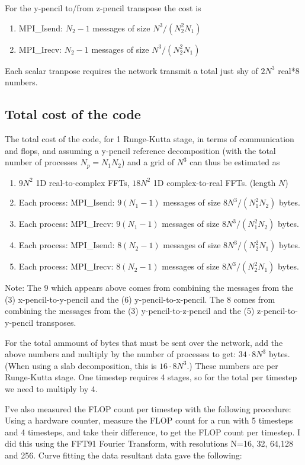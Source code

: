 \documentclass[12pt]{article}
\begin{document}
For the y-pencil to/from z-pencil transpose the cost is
\begin{enumerate}
\item MPI\_Isend:  $N_2 -1$ messages of size $N^3/(N_2^2 N_1)$
\item MPI\_Irecv:  $N_2 -1$ messages of size $N^3/(N_2^2 N_1)$
\end{enumerate}


Each scalar tranpose requires the network transmit a total just
shy of $2N^3$ real*8 numbers.  


\subsection{Total cost of the code}

The total cost of the code, for 1 Runge-Kutta stage,
in terms of communication and flops,
and assuming a y-pencil reference decomposition 
(with the total number of processes $N_p = N_1 N_2$) and a grid of $N^3$
can thus be estimated as

\begin{enumerate}
\item $9N^2$ 1D real-to-complex FFTs, $18N^2$ 1D complex-to-real FFTs.  (length $N$)
\item Each process: MPI\_Isend:  $9(N_1 -1)$ messages of size $8N^3/(N_1^2 N_2)$ bytes.
\item Each process: MPI\_Irecv:  $9(N_1 -1)$ messages of size $8N^3/(N_1^2 N_2)$ bytes.
\item Each process: MPI\_Isend:  $8(N_2 -1)$ messages of size $8N^3/(N_2^2 N_1)$ bytes.
\item Each process: MPI\_Irecv:  $8(N_2 -1)$ messages of size $8N^3/(N_2^2 N_1)$ bytes.
\end{enumerate}

Note: The 9 which appears above comes from combining the messages from the (3) x-pencil-to-y-pencil 
and the (6) y-pencil-to-x-pencil.  The 8 comes from combining the messages from the (3) y-pencil-to-z-pencil 
and the (5) z-pencil-to-y-pencil transposes.  


For the total ammount of bytes that must be sent over the network, add
the above numbers and multiply by the number of processes to get: $34
\cdot 8 N^3$ bytes.  (When using a slab decomposition, this is $16
\cdot 8 N^3$.)  These numbers are per Runge-Kutta stage.  One timestep
requires 4 stages, so for the total per timestep we need to multiply
by 4.

I've also measured the FLOP count per timestep with the following
procedure:  Using a hardware counter, measure the FLOP count
for a run with 5 timesteps and 4 timesteps, and take their
difference, to get the FLOP count per timestep.  
I did this using the FFT91 Fourier Transform, with resolutions
N=16, 32, 64,128 and 256.  Curve fitting the data resultant data
gave the following:  
\end{document}
